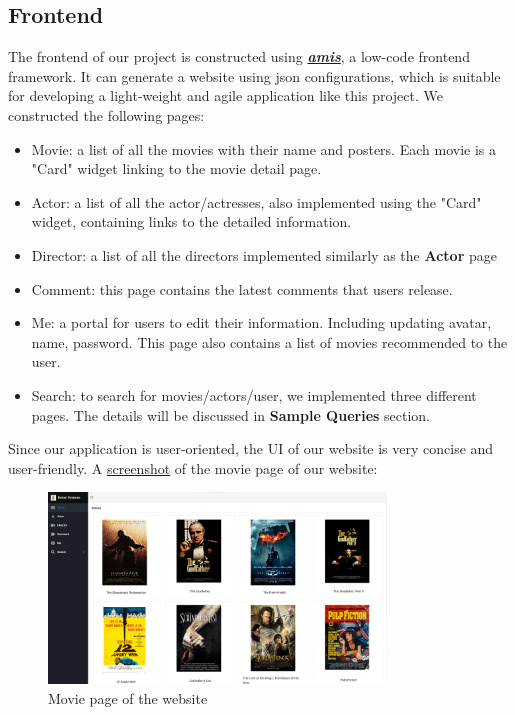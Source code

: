 \begin{CJK*}{UTF8}{gbsn}
\subsection{Frontend}
The frontend of our project is constructed using \textbf{\textit{\href{https://aisuda.bce.baidu.com/amis/zh-CN/docs/index}{amis}}}, a low-code frontend framework. It can generate a website using json configurations, which is suitable for developing a light-weight and agile application like this project. We constructed the following pages:
\begin{itemize}
    \item Movie: a list of all the movies with their name and posters. Each movie is a "Card" widget linking to the movie detail page.
    \item Actor: a list of all the actor/actresses, also implemented using the "Card" widget, containing links to the detailed information.
    \item Director: a list of all the directors implemented similarly as the \textbf{Actor} page
    \item Comment: this page contains the latest comments that users release.
    \item Me: a portal for users to edit their information. Including updating avatar, name, password. This page also contains a list of movies recommended to the user.
    \item Search: to search for movies/actors/user, we implemented three different pages. The details will be discussed in \textbf{Sample Queries} section.
\end{itemize}
\par Since our application is user-oriented, the UI of our website is very concise and user-friendly. A \hyperref[moviePage]{screenshot} of the movie page of our website:\par

\begin{figure}[htbp]
    \centering
    \label{moviePage}
    \includegraphics[width=0.8\textwidth]{website.png}
    \caption{Movie page of the website}
\end{figure}


\end{CJK*}
